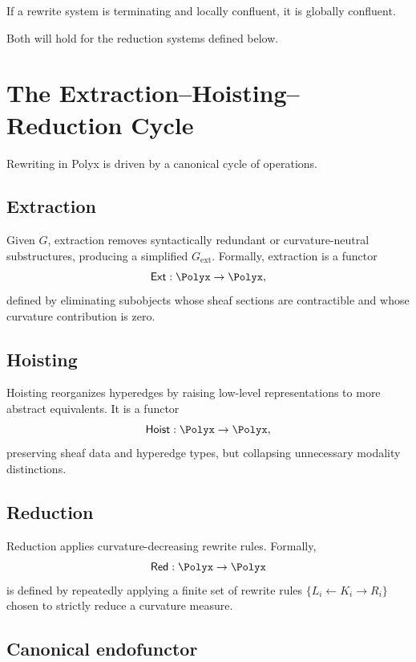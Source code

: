 \begin{theorem}
If a rewrite system is terminating and locally confluent, it is globally
confluent.
\end{theorem}

Both will hold for the reduction systems defined below.

\section{The Extraction–Hoisting–Reduction Cycle}

Rewriting in Polyx is driven by a canonical cycle of operations.

\subsection{Extraction}

Given $G$, extraction removes syntactically redundant or curvature-neutral
substructures, producing a simplified $G_{\mathrm{ext}}$.  
Formally, extraction is a functor
\[
\mathsf{Ext}: \Polyx \to \Polyx,
\]
defined by eliminating subobjects whose sheaf sections are contractible and
whose curvature contribution is zero.

\subsection{Hoisting}

Hoisting reorganizes hyperedges by raising low-level representations to more
abstract equivalents.  It is a functor
\[
\mathsf{Hoist}: \Polyx \to \Polyx,
\]
preserving sheaf data and hyperedge types, but collapsing unnecessary modality
distinctions.

\subsection{Reduction}

Reduction applies curvature-decreasing rewrite rules.  
Formally,
\[
\mathsf{Red}: \Polyx \to \Polyx
\]
is defined by repeatedly applying a finite set of rewrite rules
$\{L_i \leftarrow K_i \rightarrow R_i\}$ chosen to strictly reduce a curvature
measure.

\subsection{Canonical endofunctor}

